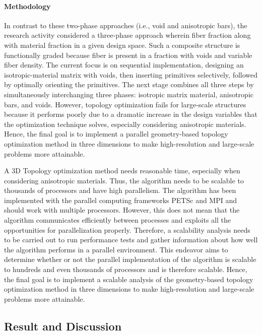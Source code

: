 \paragraph{Methodology}
In contrast to these two-phase approaches (i.e., void and anisotropic bars), the research activity considered a three-phase approach wherein fiber fraction along with material fraction in a given design space. Such a composite structure is functionally graded because fiber is present in a fraction with voids and variable fiber density. The current focus is on sequential implementation, designing an isotropic-material matrix with voids, then inserting primitives selectively, followed by optimally orienting the primitives. The next stage combines all three steps by simultaneously interchanging three phases: isotropic matrix material, anisotropic bars, and voids. However, topology optimization fails for large-scale structures because it performs poorly due to a dramatic increase in the design variables that the optimization technique solves, especially considering anisotropic materials. Hence, the final goal is to implement a parallel geometry-based topology optimization method in three dimensions to make high-resolution and large-scale problems more attainable.

A 3D Topology optimization method needs reasonable time, especially when considering anisotropic materials. Thus, the algorithm needs to be scalable to thousands of processors and have high parallelism. The algorithm has been implemented with the parallel computing frameworks PETSc and MPI and should work with multiple processors. However, this does not mean that the algorithm communicates efficiently between processes and exploits all the opportunities for parallelization properly. Therefore, a scalability analysis needs to be carried out to run performance tests and gather information about how well the algorithm performs in a parallel environment. This endeavor aims to determine whether or not the parallel implementation of the algorithm is scalable to hundreds and even thousands of processors and is therefore scalable. Hence, the final goal is to implement a scalable analysis of the geometry-based topology optimization method in three dimensions to make high-resolution and large-scale problems more attainable.

\subsection{Result and Discussion}
 
